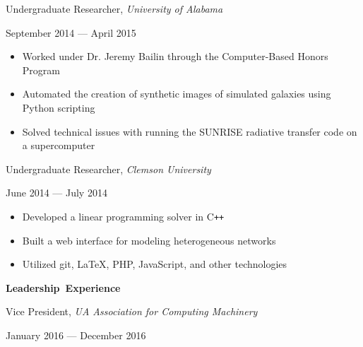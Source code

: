 \documentclass[11pt]{article}
\begin{document}
\vspace{0.4em}
\begin{minipage}[t]{0.65\textwidth}
\flushleft
Undergraduate Researcher, \textit{University of Alabama}\\
\end{minipage}
\begin{minipage}[t]{0.30\textwidth}
\flushright
September 2014 --- April 2015\\
\end{minipage}

\begin{itemize}
  \item Worked under Dr. Jeremy Bailin through the Computer-Based Honors Program
  \item Automated the creation of synthetic images of simulated galaxies using Python scripting
  \item Solved technical issues with running the SUNRISE radiative transfer code on a supercomputer
\end{itemize}

\begin{minipage}[t]{0.65\textwidth}
\flushleft
Undergraduate Researcher, \textit{Clemson University}\\
\end{minipage}
\begin{minipage}[t]{0.30\textwidth}
\flushright
June 2014 --- July 2014\\
\end{minipage}

\begin{itemize}
  \item Developed a linear programming solver in C\texttt{++}
  \item Built a web interface for modeling heterogeneous networks
  \item Utilized git, \LaTeX, PHP, JavaScript, and other technologies
\end{itemize}

\vspace{0.8em}
\hbox{\large \textbf{Leadership Experience}}

\vspace{0.4em}
\begin{minipage}[t]{0.65\textwidth}
\flushleft
Vice President, \textit{UA Association for Computing Machinery}\\
\end{minipage}
\begin{minipage}[t]{0.30\textwidth}
\flushright
January 2016 --- December 2016\\
\end{minipage}
\end{document}
